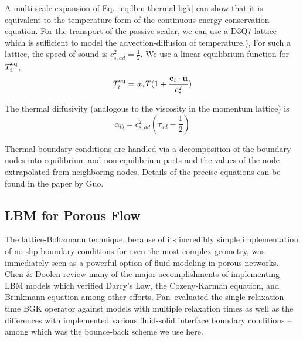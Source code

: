 A multi-scale expansion of Eq.~\ref{eq:lbm-thermal-bgk} can show that it is equivalent to the temperature form of the continuous energy conservation equation.\cite{Guo2002} For the transport of the passive scalar, we can use a D3Q7 lattice which is sufficient to model the advection-diffusion of temperature.\cite{Latt2007,Parmigiani2011}), For such a lattice, the speed of sound is $c^2_{s,ad} = \frac{1}{2}$. We use a linear equilibrium function for $T_i^{\text{eq}}$,
\begin{equation}
	T_i^{\text{eq}} = w_i T (1+\frac{\mathbf{c}_i\cdot\mathbf{u}}{c_s^2})
\end{equation}

The thermal diffusivity (analogous to the viscosity in the momentum lattice) is 
\begin{equation}
	\alpha_{lb} = c_{s,ad}^2(\tau_{ad} - \frac{1}{2})
\end{equation}

Thermal boundary conditions are handled via a decomposition of the boundary nodes into equilibrium and non-equilibrium parts and the values of the node extrapolated from neighboring nodes. Details of the precise equations can be found in the paper by Guo\etal.\cite{Guo2002}






\subsection{LBM for Porous Flow}
The lattice-Boltzmann technique, because of its incredibly simple implementation of no-slip boundary conditions for even the most complex geometry, was immediately seen as a powerful option of fluid modeling in porous networks. Chen \& Doolen review many of the major accomplishments of implementing LBM models which verified Darcy's Law, the Cozeny-Karman equation, and Brinkmann equation among other efforts.\cite{Chen1998a} Pan\etal~evaluated the single-relaxation time BGK operator against models with multiple relaxation times as well as the differences with implemented various fluid-solid interface boundary conditions -- among which was the bounce-back scheme we use here.\cite{Pan2006}
